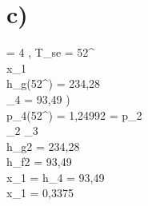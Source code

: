 

\section*{c)}
 \quad {} = 4 , \quad T_{se} = 52^\circ {} \\
 \quad x_1 \\

 \quad h_{g}(52^\circ {}) = 234,28  \\
_4 = 93,49 ) \\
 \quad p_{4}(52^\circ {}) = 1,24992  = p_2 \\

_2 _3  \\
h_{g2} = 234,28  \\
h_{f2} = 93,49  \\

x_1 =  \quad {} \quad h_4 = 93,49 \\

\Rightarrow x_1 = 0,3375 \\